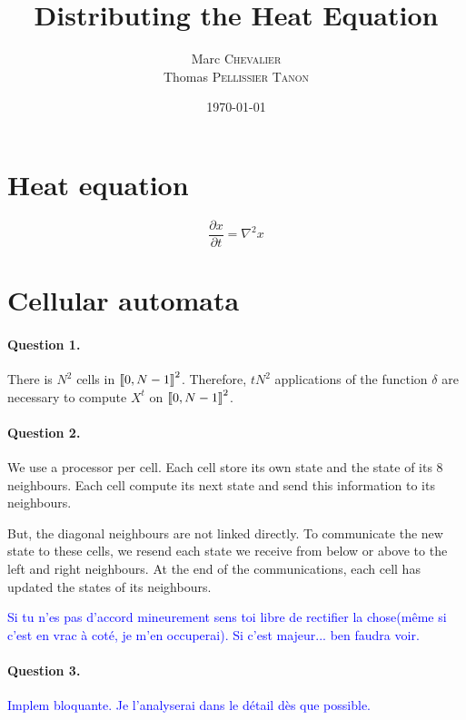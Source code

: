 

\author{
    Marc \textsc{Chevalier}\\
    Thomas \textsc{Pellissier Tanon}
}
\date{\today}
\title{Distributing the Heat Equation}


\maketitle

\section{Heat equation}

$$
    \frac{\partial x}{\partial t}=\nabla^2 x
$$

\section{Cellular automata}

\paragraph{Question 1.} There is $N^2$ cells in $\left\llbracket 0,N-1 \right\rrbracket^2$. Therefore, $tN^2$ applications of the function $\delta$ are necessary to compute $X^t$ on $\left\llbracket 0,N-1 \right\rrbracket^2$.

\paragraph{Question 2.} We use a processor per cell. Each cell store its own state and the state of its 8 neighbours. Each cell compute its next state and send this information to its neighbours.

But, the diagonal neighbours are not linked directly. To communicate the new state to these cells, we resend each state we receive from below or above to the left and right neighbours. At the end of the communications, each cell has updated the states of its neighbours.

\textcolor{blue}{Si tu n'es pas d'accord mineurement sens toi libre de rectifier la chose(même si c'est en vrac à coté, je m'en occuperai). Si c'est majeur... ben faudra voir.}

\paragraph{Question 3.}

\textcolor{blue}{Implem bloquante. Je l'analyserai dans le détail dès que possible.}

